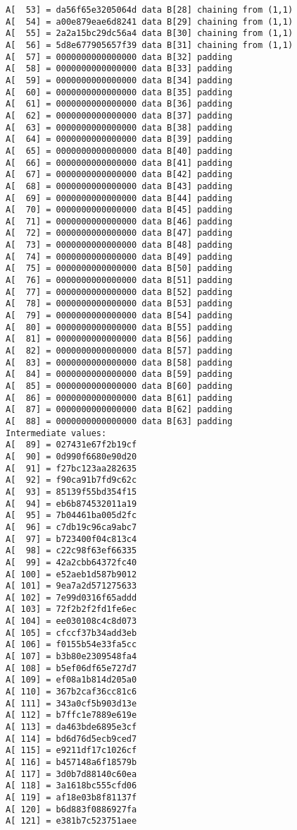 \begin{verbatim}
A[  53] = da56f65e3205064d data B[28] chaining from (1,1)
A[  54] = a00e879eae6d8241 data B[29] chaining from (1,1)
A[  55] = 2a2a15bc29dc56a4 data B[30] chaining from (1,1)
A[  56] = 5d8e677905657f39 data B[31] chaining from (1,1)
A[  57] = 0000000000000000 data B[32] padding
A[  58] = 0000000000000000 data B[33] padding
A[  59] = 0000000000000000 data B[34] padding
A[  60] = 0000000000000000 data B[35] padding
A[  61] = 0000000000000000 data B[36] padding
A[  62] = 0000000000000000 data B[37] padding
A[  63] = 0000000000000000 data B[38] padding
A[  64] = 0000000000000000 data B[39] padding
A[  65] = 0000000000000000 data B[40] padding
A[  66] = 0000000000000000 data B[41] padding
A[  67] = 0000000000000000 data B[42] padding
A[  68] = 0000000000000000 data B[43] padding
A[  69] = 0000000000000000 data B[44] padding
A[  70] = 0000000000000000 data B[45] padding
A[  71] = 0000000000000000 data B[46] padding
A[  72] = 0000000000000000 data B[47] padding
A[  73] = 0000000000000000 data B[48] padding
A[  74] = 0000000000000000 data B[49] padding
A[  75] = 0000000000000000 data B[50] padding
A[  76] = 0000000000000000 data B[51] padding
A[  77] = 0000000000000000 data B[52] padding
A[  78] = 0000000000000000 data B[53] padding
A[  79] = 0000000000000000 data B[54] padding
A[  80] = 0000000000000000 data B[55] padding
A[  81] = 0000000000000000 data B[56] padding
A[  82] = 0000000000000000 data B[57] padding
A[  83] = 0000000000000000 data B[58] padding
A[  84] = 0000000000000000 data B[59] padding
A[  85] = 0000000000000000 data B[60] padding
A[  86] = 0000000000000000 data B[61] padding
A[  87] = 0000000000000000 data B[62] padding
A[  88] = 0000000000000000 data B[63] padding
Intermediate values:
A[  89] = 027431e67f2b19cf
A[  90] = 0d990f6680e90d20
A[  91] = f27bc123aa282635
A[  92] = f90ca91b7fd9c62c
A[  93] = 85139f55bd354f15
A[  94] = eb6b874532011a19
A[  95] = 7b04461ba005d2fc
A[  96] = c7db19c96ca9abc7
A[  97] = b723400f04c813c4
A[  98] = c22c98f63ef66335
A[  99] = 42a2cbb64372fc40
A[ 100] = e52aeb1d587b9012
A[ 101] = 9ea7a2d571275633
A[ 102] = 7e99d0316f65addd
A[ 103] = 72f2b2f2fd1fe6ec
A[ 104] = ee030108c4c8d073
A[ 105] = cfccf37b34add3eb
A[ 106] = f0155b54e33fa5cc
A[ 107] = b3b80e2309548fa4
A[ 108] = b5ef06df65e727d7
A[ 109] = ef08a1b814d205a0
A[ 110] = 367b2caf36cc81c6
A[ 111] = 343a0cf5b903d13e
A[ 112] = b7ffc1e7889e619e
A[ 113] = da463bde6895e3cf
A[ 114] = bd6d76d5ecb9ced7
A[ 115] = e9211df17c1026cf
A[ 116] = b457148a6f18579b
A[ 117] = 3d0b7d88140c60ea
A[ 118] = 3a1618bc555cfd06
A[ 119] = af18e03b8f81137f
A[ 120] = b6d883f0886927fa
A[ 121] = e381b7c523751aee

\end{verbatim}

